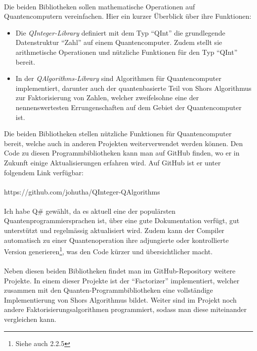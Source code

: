 \paragraph{}
Die beiden Bibliotheken sollen mathematische Operationen auf Quantencomputern vereinfachen. Hier ein kurzer Überblick über ihre Funktionen: %
\begin{itemize}
  \item Die \textit{QInteger-Library} definiert mit dem Typ "`QInt"' die grundlegende Datenstruktur "`Zahl"' auf einem Quantencomputer. Zudem stellt sie arithmetische Operationen und nützliche Funktionen für den Typ "`QInt"' bereit. %
  \item In der \textit{QAlgorithms-Library} sind Algorithmen für Quantencomputer implementiert, darunter auch der quantenbasierte Teil von Shors Algorithmus zur Faktorisierung von Zahlen, welcher zweifelsohne eine der nennenswertesten Errungenschaften auf dem Gebiet der Quantencomputer ist.
\end{itemize}
Die beiden Bibliotheken stellen nützliche Funktionen für Quantencomputer bereit, welche auch in anderen Projekten weiterverwendet werden können. Den Code zu diesen Programmbibliotheken kann man auf GitHub finden, wo er in Zukunft einige Aktualisierungen erfahren wird. Auf GitHub ist er unter folgendem Link verfügbar:
\paragraph{}
\centerline{ https://github.com/johutha/QInteger-QAlgorithms }
\paragraph{}
Ich habe Q\# gewählt, da es aktuell eine der populärsten Quantenprogrammiersprachen ist, über eine gute Dokumentation verfügt, gut unterstützt und regelmässig aktualisiert wird. Zudem kann der Compiler automatisch zu einer Quantenoperation ihre adjungierte oder kontrollierte Version generieren\footnote{Siehe auch 2.2.5}, was den Code kürzer und übersichtlicher macht.

\paragraph{}

Neben diesen beiden Bibliotheken findet man im GitHub-Repository weitere Projekte. In einem dieser Projekte ist der "`Factorizer"' implementiert, welcher zusammen mit den Quanten-Programmbibliotheken eine vollständige Implementierung von Shors Algorithmus bildet. Weiter sind im Projekt noch andere Faktorisierungsalgorithmen programmiert, sodass man diese miteinander vergleichen kann.

